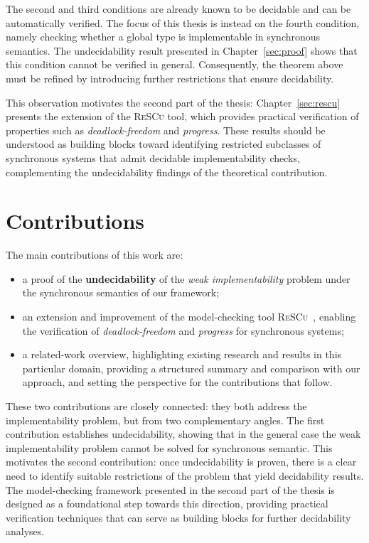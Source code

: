 The second and third conditions are already known to be decidable and 
can be automatically verified. The focus of this thesis is instead on 
the fourth condition, namely checking whether a global type is 
implementable in synchronous semantics. The undecidability result 
presented in Chapter~\ref{sec:proof} shows that this condition cannot 
be verified in general. Consequently, the theorem above must be refined 
by introducing further restrictions that ensure decidability.  

This observation motivates the second part of the thesis: 
Chapter~\ref{sec:rescu} presents the extension of the 
\textsc{ReSCu} tool, which provides practical verification of 
properties such as \emph{deadlock-freedom} and \emph{progress}. These 
results should be understood as building blocks toward identifying 
restricted subclasses of synchronous systems that admit decidable 
implementability checks, complementing the undecidability findings of 
the theoretical contribution.

\section{Contributions}
The main contributions of this work are: 
\begin{itemize}
    \item a proof of the \textbf{undecidability} of the 
    \textit{weak implementability} problem under the synchronous 
    semantics of our framework;
    \item an extension and improvement of the model-checking tool 
    \textsc{ReSCu}~\cite{rescurepo}, enabling the verification of 
    \textit{deadlock-freedom} and \textit{progress} for synchronous 
    systems;
    \item a related-work overview, highlighting existing research and 
    results in this particular domain, providing a structured summary 
    and comparison with our approach, and setting the perspective for 
    the contributions that follow.
\end{itemize}

These two contributions are closely connected: they both address the 
implementability problem, but from two complementary angles. The first 
contribution establishes undecidability, showing that in the general 
case the weak implementability problem cannot be solved for synchronous semantic. 
This motivates the second contribution: once undecidability is proven, 
there is a clear need to identify suitable restrictions of the problem 
that yield decidability results. The model-checking framework presented 
in the second part of the thesis is designed as a foundational step 
towards this direction, providing practical verification techniques that 
can serve as building blocks for further decidability analyses.  

